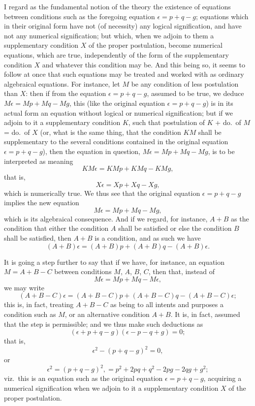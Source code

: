 \documentclass[11pt,a4paper,english]{article}
\theoremstyle{plain}
\begin{document}
I regard as the fundamental notion of the theory the existence of equations between conditions such as the foregoing equation $\epsilon = p + q - g$; equations which in their original form have not (of necessity) any logical signification, and have not any numerical signification; but which, when we adjoin to them a supplementary condition $X$ of the proper postulation, become numerical equations, which are true, independently of the form of the supplementary condition $X$ and whatever this condition may be. And this being so, it seems to follow at once that such equations may be treated and worked with as ordinary algebraical equations. For instance, let $M$ be any condition of less postulation than $X$: then if from the equation $\epsilon = p + q - g$, assumed to be true, we deduce $M\epsilon = Mp + Mq - Mg$, this (like the original equation $\epsilon = p + q - g$) is in its actual form an equation without logical or numerical signification; but if we adjoin to it a supplementary condition $K$, such that postulation of $K$ + do.\ of $M$ = do.\ of $X$ (or, what is the same thing, that the condition $KM$ shall be supplementary to the several conditions contained in the original equation $\epsilon = p + q - g$), then the equation in question, $M\epsilon = Mp + Mq - Mg$, is to be interpreted as meaning
\[
KM\epsilon = KMp + KMq - KMg,
\]
that is,
\[
X\epsilon = Xp + Xq - Xg,
\]
which is numerically true. We thus see that the original equation $\epsilon = p + q - g$ implies the new equation
\[
M\epsilon = Mp + Mq - Mg,
\]
which is its algebraical consequence. And if we regard, for instance, $A + B$ as the condition that either the condition $A$ shall be satisfied or else the condition $B$ shall be satisfied, then $A + B$ is a condition, and as such we have
\[
(A + B)\epsilon = (A + B)p + (A + B)q - (A + B)\epsilon.
\]

It is going a step further to say that if we have, for instance, an equation $M = A + B - C$ between conditions $M$, $A$, $B$, $C$, then that, instead of
\[
M\epsilon = Mp + Mq - M\epsilon,
\]
we may write
\[
(A + B - C)\epsilon = (A + B - C)p + (A + B - C)q - (A + B - C)\epsilon;
\]
this is, in fact, treating $A + B - C$ as being to all intents and purposes a condition such as $M$, or an alternative condition $A + B$. It is, in fact, assumed that the step is permissible; and we thus make such deductions as
\[
(\epsilon + p + q - g)(\epsilon - p - q + g) = 0;
\]
that is,
\[
\epsilon^2 - (p + q - g)^2 = 0,
\]
or
\[
\epsilon^2 = (p + q - g)^2, = p^2 + 2pq + q^2 - 2pg - 2qg + g^2;
\]
viz.\ this is an equation such as the original equation $\epsilon = p + q - g$, acquiring a numerical signification when we adjoin to it a supplementary condition $X$ of the proper postulation.
\end{document}
